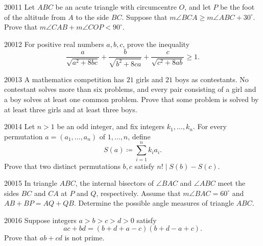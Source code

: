 
\begin{problem}{2001}{1}
Let $ABC$ be an acute triangle with circumcentre $O$, and let $P$ be the foot of the altitude from $A$ to the side $BC$. Suppose that $m\angle BCA\geq m\angle ABC+30^\circ$. Prove that $m\angle CAB+m\angle COP<90^\circ$.
\end{problem}

\begin{problem}{2001}{2}
For positive real numbers $a, b, c$, prove the inequality
\[
    \frac{a}{\sqrt{a^2+8bc}}+\frac{b}{\sqrt{b^2+8ca}}+\frac{c}{\sqrt{c^2+8ab}}\geq1.
\]
\end{problem}

\begin{problem}{2001}{3}
A mathematics competition has $21$ girls and $21$ boys as contestants. No contestant solves more than six problems, and every pair consisting of a girl and a boy solves at least one common problem. Prove that some problem is solved by at least three girls and at least three boys.
\end{problem}

\begin{problem}{2001}{4}
Let $n>1$ be an odd integer, and fix integers $k_1, \dots, k_n$. For every permutation $a=(a_1, \dots, a_n)$ of $1, \dots, n$, define
\[
    S(a)\coloneqq\sum_{i=1}^n k_i a_i.
\]
Prove that two distinct permutations $b, c$ satisfy $n!\mid S(b)-S(c)$.
\end{problem}

\begin{problem}{2001}{5}
In triangle $ABC$, the internal bisectors of $\angle BAC$ and $\angle ABC$ meet the sides $BC$ and $CA$ at $P$ and $Q$, respectively. Assume that $m\angle BAC=60^\circ$ and $AB+BP=AQ+QB$. Determine the possible angle measures of triangle $ABC$.
\end{problem}

\begin{problem}{2001}{6}
Suppose integers $a>b>c>d>0$ satisfy
\[
    ac+bd=(b+d+a-c)(b+d-a+c).
\]
Prove that $ab+cd$ is not prime.
\end{problem}
